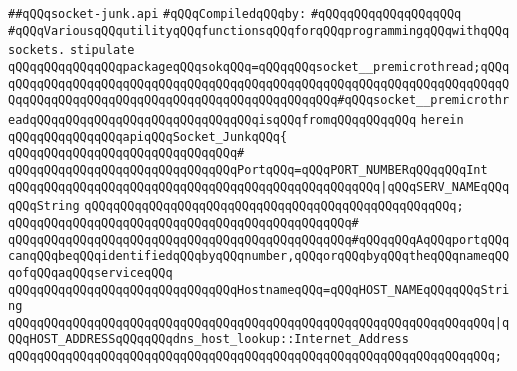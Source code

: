 \label{src/lib/internet/socket-junk.api}
\verb|##qQQqsocket-junk.api|\newline
\newline
\verb|#qQQqCompiledqQQqby:|\newline
\verb|#qQQqqQQqqQQqqQQqqQQq|\newline
\newline
\newline
\newline
\verb|#qQQqVariousqQQqutilityqQQqfunctionsqQQqforqQQqprogrammingqQQqwithqQQqsockets.|\newline
\newline
\verb|stipulate|\newline
\verb|qQQqqQQqqQQqqQQqpackageqQQqsokqQQq=qQQqqQQqsocket__premicrothread;qQQqqQQqqQQqqQQqqQQqqQQqqQQqqQQqqQQqqQQqqQQqqQQqqQQqqQQqqQQqqQQqqQQqqQQqqQQqqQQqqQQqqQQqqQQqqQQqqQQqqQQqqQQqqQQqqQQqqQQq#qQQqsocket__premicrothreadqQQqqQQqqQQqqQQqqQQqqQQqqQQqqQQqisqQQqfromqQQqqQQqqQQq|\newline
\verb|herein|\newline
\newline
\verb|qQQqqQQqqQQqqQQqapiqQQqSocket_JunkqQQq{|\newline
\verb|qQQqqQQqqQQqqQQqqQQqqQQqqQQqqQQq#|\newline
\verb|qQQqqQQqqQQqqQQqqQQqqQQqqQQqqQQqPortqQQq=qQQqPORT_NUMBERqQQqqQQqInt|\newline
\verb|qQQqqQQqqQQqqQQqqQQqqQQqqQQqqQQqqQQqqQQqqQQqqQQqqQQq|\verb#|qQQqSERV_NAMEqQQqqQQqString#\newline
\verb|qQQqqQQqqQQqqQQqqQQqqQQqqQQqqQQqqQQqqQQqqQQqqQQqqQQq;|\newline
\verb|qQQqqQQqqQQqqQQqqQQqqQQqqQQqqQQqqQQqqQQqqQQqqQQq#|\newline
\verb|qQQqqQQqqQQqqQQqqQQqqQQqqQQqqQQqqQQqqQQqqQQqqQQq#qQQqqQQqAqQQqportqQQqcanqQQqbeqQQqidentifiedqQQqbyqQQqnumber,qQQqorqQQqbyqQQqtheqQQqnameqQQqofqQQqaqQQqserviceqQQq|\newline
\newline
\verb|qQQqqQQqqQQqqQQqqQQqqQQqqQQqqQQqHostnameqQQq=qQQqHOST_NAMEqQQqqQQqString|\newline
\verb|qQQqqQQqqQQqqQQqqQQqqQQqqQQqqQQqqQQqqQQqqQQqqQQqqQQqqQQqqQQqqQQqqQQq|\verb#|qQQqHOST_ADDRESSqQQqqQQqdns_host_lookup::Internet_Address#\newline
\verb|qQQqqQQqqQQqqQQqqQQqqQQqqQQqqQQqqQQqqQQqqQQqqQQqqQQqqQQqqQQqqQQqqQQq;|\newline

